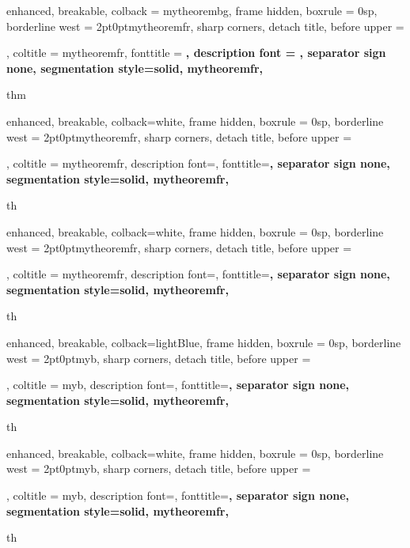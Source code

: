 {%
	enhanced,
	breakable,
	colback = mytheorembg,
	frame hidden,
	boxrule = 0sp,
	borderline west = {2pt}{0pt}{mytheoremfr},
	sharp corners,
	detach title,
	before upper = \tcbtitle\par\smallskip,
	coltitle = mytheoremfr,
	fonttitle = \bfseries{}\selectfont,
	description font = \mdseries{}\selectfont,
	separator sign none,
	segmentation style={solid, mytheoremfr},
}
{thm}

{
	enhanced,
	breakable,
	colback=white,
	frame hidden,
	boxrule = 0sp,
	borderline west = {2pt}{0pt}{mytheoremfr},
	sharp corners,
	detach title,
	before upper = \tcbtitle\par\smallskip,
	coltitle = mytheoremfr,
	description font=\selectfont,
	fonttitle=\selectfont\bfseries,
	separator sign none,
	segmentation style={solid, mytheoremfr},
}
{th}


{
	enhanced,
	breakable,
	colback=white,
	frame hidden,
	boxrule = 0sp,
	borderline west = {2pt}{0pt}{mytheoremfr},
	sharp corners,
	detach title,
	before upper = \tcbtitle\par\smallskip,
	coltitle = mytheoremfr,
	description font=\selectfont,
	fonttitle=\selectfont\bfseries,
	separator sign none,
	segmentation style={solid, mytheoremfr},
}
{th}




{
	enhanced,
	breakable,
	colback=lightBlue,
	frame hidden,
	boxrule = 0sp,
	borderline west = {2pt}{0pt}{myb},
	sharp corners,
	detach title,
	before upper = \tcbtitle\par\smallskip,
	coltitle = myb,
	description font=\selectfont,
	fonttitle=\selectfont\bfseries,
	separator sign none,
	segmentation style={solid, mytheoremfr},
}
{th}



{
	enhanced,
	breakable,
	colback=white,
	frame hidden,
	boxrule = 0sp,
	borderline west = {2pt}{0pt}{myb},
	sharp corners,
	detach title,
	before upper = \tcbtitle\par\smallskip,
	coltitle = myb,
	description font=\mdseries{}\selectfont,
	fonttitle=\selectfont\bfseries,
	separator sign none,
	segmentation style={solid, mytheoremfr},
}
{th}



